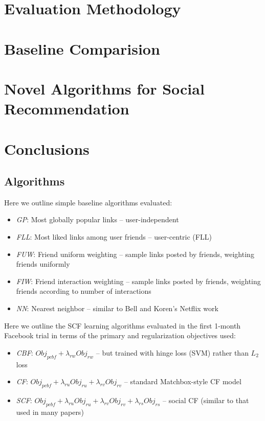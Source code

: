 \documentclass{sig-alternate}
\newcommand{\Obj}{\mathit{Obj}}
\newcommand{\pcbf}{\mathit{pcbf}}
\newcommand{\ru}{\mathit{ru}}
\newcommand{\rv}{\mathit{rv}}
\newcommand{\rw}{\mathit{rw}}
\newcommand{\rs}{\mathit{rs}}
\begin{document}
\section{Evaluation Methodology}
\label{sec:Evaluation}


\section{Baseline Comparision}
\label{sec:Baselines}


\section{Novel Algorithms for Social Recommendation}
\label{sec:NovelAlgs}


\section{Conclusions}
\label{sec:Conclusions}


\COMMENT
\subsection{Algorithms}

Here we outline simple baseline algorithms evaluated:
\begin{itemize}
\item {\it GP}: Most globally popular links -- user-independent
\item {\it FLL}: Most liked links among user friends -- user-centric (FLL) 
\item {\it FUW}: Friend uniform weighting -- sample links posted by friends, weighting friends uniformly
\item {\it FIW}: Friend interaction weighting -- sample links posted by friends, weighting friends according to number of interactions
\item {\it NN}: Nearest neighbor -- similar to Bell and Koren's Netflix work
\end{itemize}

Here we outline the SCF learning algorithms evaluated in the first
1-month Facebook trial in terms of
the primary and regularization objectives used:
\begin{itemize}
\item {\it CBF}: $\Obj_\pcbf + \lambda_\rw \Obj_\rw$ -- but trained with hinge loss (SVM) rather than $L_2$ loss
\item {\it CF}: $\Obj_\pcbf + \lambda_\ru \Obj_\ru + \lambda_\rv \Obj_\rv$ -- standard Matchbox-style CF model
\item {\it SCF}: $\Obj_\pcbf + \lambda_\ru \Obj_\ru + \lambda_\rv \Obj_\rv + \lambda_\rs \Obj_\rs$ -- social CF (similar to that used in many papers)
\end{itemize}
\end{document}
